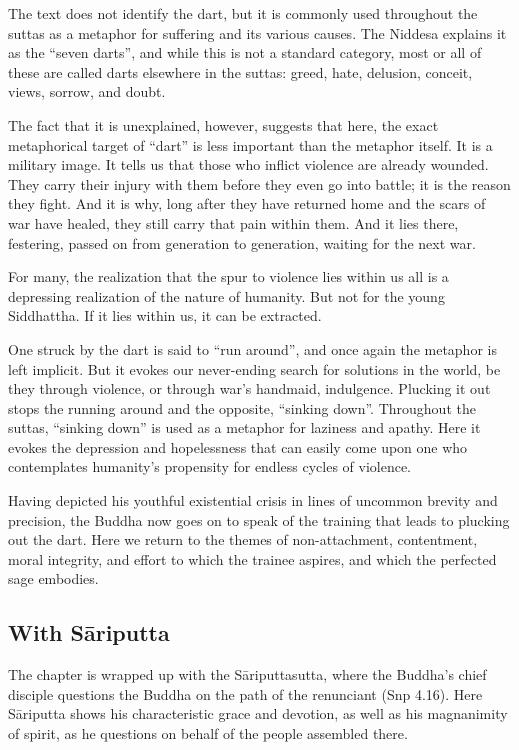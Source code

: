 \documentclass[12pt,openany]{book}%
\begin{document}
The text does not identify the dart, but it is commonly used throughout the suttas as a metaphor for suffering and its various causes. The Niddesa explains it as the “seven darts”, and while this is not a standard category, most or all of these are called darts elsewhere in the suttas: greed, hate, delusion, conceit, views, sorrow, and doubt.

The fact that it is unexplained, however, suggests that here, the exact metaphorical target of “dart” is less important than the metaphor itself. It is a military image. It tells us that those who inflict violence are already wounded. They carry their injury with them before they even go into battle; it is the reason they fight. And it is why, long after they have returned home and the scars of war have healed, they still carry that pain within them. And it lies there, festering, passed on from generation to generation, waiting for the next war.

For many, the realization that the spur to violence lies within us all is a depressing realization of the nature of humanity. But not for the young Siddhattha. If it lies within us, it can be extracted.

One struck by the dart is said to “run around”, and once again the metaphor is left implicit. But it evokes our never-ending search for solutions in the world, be they through violence, or through war's handmaid, indulgence. Plucking it out stops the running around and the opposite, “sinking down”. Throughout the suttas, “sinking down” is used as a metaphor for laziness and apathy. Here it evokes the depression and hopelessness that can easily come upon one who contemplates humanity’s propensity for endless cycles of violence.

Having depicted his youthful existential crisis in lines of uncommon brevity and precision, the Buddha now goes on to speak of the training that leads to plucking out the dart. Here we return to the themes of non-attachment, contentment, moral integrity, and effort to which the trainee aspires, and which the perfected sage embodies.

\subsection*{With \textsanskrit{Sāriputta}}

The chapter is wrapped up with the \textsanskrit{Sāriputtasutta}, where the Buddha’s chief disciple questions the Buddha on the path of the renunciant (Snp 4.16). Here \textsanskrit{Sāriputta} shows his characteristic grace and devotion, as well as his magnanimity of spirit, as he questions on behalf of the people assembled there.
\end{document}
